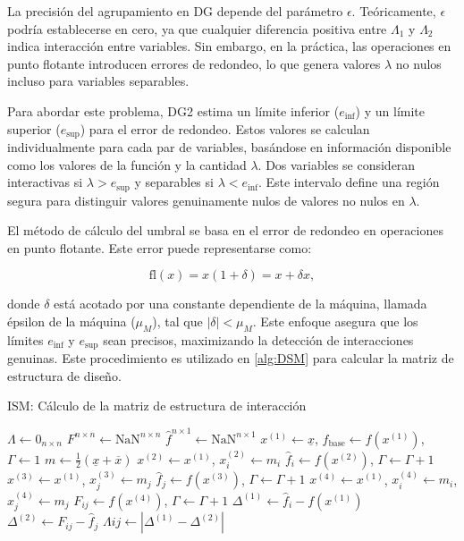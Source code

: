La precisión del agrupamiento en DG depende del parámetro \(\epsilon\). Teóricamente, \(\epsilon\) podría establecerse en cero, ya que cualquier diferencia positiva entre \(\Lambda_1\) y \(\Lambda_2\) indica interacción entre variables. Sin embargo, en la práctica, las operaciones en punto flotante introducen errores de redondeo, lo que genera valores \(\lambda\) no nulos incluso para variables separables.

Para abordar este problema, DG2 estima un límite inferior (\(e_{\text{inf}}\)) y un límite superior (\(e_{\text{sup}}\)) para el error de redondeo. Estos valores se calculan individualmente para cada par de variables, basándose en información disponible como los valores de la función y la cantidad \(\lambda\). Dos variables se consideran interactivas si \(\lambda > e_{\text{sup}}\) y separables si \(\lambda < e_{\text{inf}}\). Este intervalo define una región segura para distinguir valores genuinamente nulos de valores no nulos en \(\lambda\).

El método de cálculo del umbral se basa en el error de redondeo en operaciones en punto flotante. Este error puede representarse como:

\[
\text{fl}(x) = x(1+\delta) = x + \delta x,
\]

donde \(\delta\) está acotado por una constante dependiente de la máquina, llamada épsilon de la máquina (\(\mu_M\)), tal que \(|\delta| < \mu_M\). Este enfoque asegura que los límites \(e_{\text{inf}}\) y \(e_{\text{sup}}\) sean precisos, maximizando la detección de interacciones genuinas. Este procedimiento es utilizado en \ref{alg:DSM} para calcular la matriz de estructura de diseño.

\begin{algorithm}[H]
\caption{ISM: Cálculo de la matriz de estructura de interacción}
\label{alg:ISM}
\begin{algorithmic}[1]
\STATE $\Lambda \gets 0_{n \times n}$
\STATE $F^{n \times n} \gets \text{NaN}^{n \times n}$ 
\STATE $\hat{f}^{n \times 1} \gets \text{NaN}^{n \times 1}$ 
\STATE $x^{(1)} \gets \underline{x}$, $f_{\text{base}} \gets f(x^{(1)})$, $\Gamma \gets 1$
\STATE $m \gets \frac{1}{2}(\underline{x} + \overline{x})$
        \STATE $x^{(2)} \gets x^{(1)}$, $x^{(2)}_i \gets m_i$
        \STATE $\hat{f}_i \gets f(x^{(2)})$, $\Gamma \gets \Gamma + 1$
                \STATE $x^{(3)} \gets x^{(1)}$, $x^{(3)}_j \gets m_j$
                \STATE $\hat{f}_j \gets f(x^{(3)})$, $\Gamma \gets \Gamma + 1$
                \STATE $x^{(4)} \gets x^{(1)}$, $x^{(4)}_i \gets m_i$, $x^{(4)}_j \gets m_j$
                \STATE $F_{ij} \gets f(x^{(4)})$, $\Gamma \gets \Gamma + 1$
                \STATE $\Delta^{(1)} \gets \hat{f}_i - f(x^{(1)})$
                \STATE $\Delta^{(2)} \gets F_{ij} - \hat{f}_j$
                \STATE $\Lambda{ij} \gets |\Delta^{(1)} - \Delta^{(2)}|$
            \ENDIF
        \ENDFOR
    \ENDIF
\ENDFOR
\end{algorithmic}
\end{algorithm}

